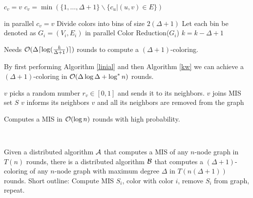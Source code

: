 \documentclass[11pt, oneside]{book}   						%
\begin{document}
\begin{algorithm}
\caption{}\label{colorred}
\begin{algorithmic}[1]
\ForEach[node $v$]
	\State $c_v = v$
\EndForEach
{}
	\State $c_v =\min(\{1,\hdots, \Delta +1\}\backslash \{c_u|(u,v)\in E\})$
\EndFor
\end{algorithmic}
\end{algorithm}

\begin{algorithm}
\caption{}\label{kw}
\begin{algorithmic}[1]
\ForEach[node $v$] in parallel
	\State $c_v = v$
\EndForEach
{}
	\State Divide colors into bins of size $2(\Delta +1)$
	\State Let each bin be denoted as $G_i =(V_i,E_i)$
	 in parallel
		\State Color Reduction($G_i$)
		\State $k = k- \Delta + 1$
	\EndFor
\EndWhile
\end{algorithmic}
\end{algorithm}
\begin{mythm} Needs $\mathcal{O}(\Delta\lceil\log(\frac{k}{\Delta+1})\rceil)$ rounds to compute a $(\Delta+1)$-coloring.\end{mythm}

\begin{mythm}By first performing Algorithm \ref{linial} and then Algorithm \ref{kw} we can achieve a $(\Delta+1)$-coloring in $\mathcal{O}(\Delta\log\Delta + \log^*n)$ rounds.\end{mythm}

\begin{algorithm}
\caption{}\label{luby}
\begin{algorithmic}[1]
	\ForEach[node $v$]
		\State $v$ picks a random number $r_v\in [0,1]$ and sends it to its neighbors.
	\EndForEach
	\ForEach[node $v$]
			\State $v$ joins MIS set $S$
			\State $v$ informs its neighbors
			\State $v$ and all its neighbors are removed from the graph
		\EndIf
	\EndForEach
\EndWhile
\end{algorithmic}
\end{algorithm}
\begin{mythm} Computes a MIS in $\mathcal{O}(\log n)$ rounds with high probability.\end{mythm}\hfill\\
\begin{mythm}Given a distributed algorithm $\mathcal{A}$ that computes a MIS of any $n$-node graph in $T(n)$ rounds, there is a distributed algorithm $\mathcal{B}$ that computes a $(\Delta+1)$-coloring of any $n$-node graph with maximum degree $\Delta$ in $T(n(\Delta+1))$ rounds. Short outline: Compute MIS $S_i$, color with color $i$, remove $S_i$ from graph, repeat.\end{mythm}
\end{document}
